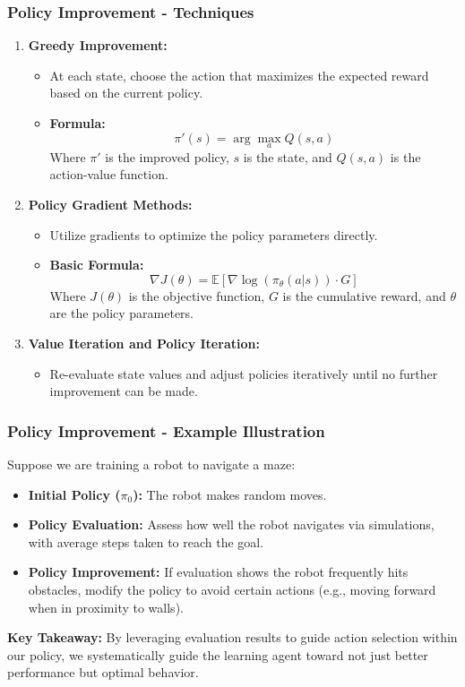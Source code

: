 \documentclass[aspectratio=169]{beamer}
\begin{document}
\begin{frame}[fragile]
    \frametitle{Policy Improvement - Techniques}
    \begin{enumerate}
        \item \textbf{Greedy Improvement:}
            \begin{itemize}
                \item At each state, choose the action that maximizes the expected reward based on the current policy.
                \item \textbf{Formula:} 
                \[
                \pi' (s) = \arg\max_a Q(s, a)
                \]
                Where \(\pi'\) is the improved policy, \(s\) is the state, and \(Q(s, a)\) is the action-value function.
            \end{itemize}
        
        \item \textbf{Policy Gradient Methods:}
            \begin{itemize}
                \item Utilize gradients to optimize the policy parameters directly.
                \item \textbf{Basic Formula:}
                \[
                \nabla J(\theta) = \mathbb{E}[\nabla \log(\pi_\theta(a|s)) \cdot G]
                \]
                Where \(J(\theta)\) is the objective function, \(G\) is the cumulative reward, and \(\theta\) are the policy parameters.
            \end{itemize}
        
        \item \textbf{Value Iteration and Policy Iteration:}
            \begin{itemize}
                \item Re-evaluate state values and adjust policies iteratively until no further improvement can be made.
            \end{itemize}
    \end{enumerate}
\end{frame}

\begin{frame}[fragile]
    \frametitle{Policy Improvement - Example Illustration}
    Suppose we are training a robot to navigate a maze: 
    \begin{itemize}
        \item \textbf{Initial Policy (\(\pi_0\)):} The robot makes random moves.
        \item \textbf{Policy Evaluation:} Assess how well the robot navigates via simulations, with average steps taken to reach the goal.
        \item \textbf{Policy Improvement:} If evaluation shows the robot frequently hits obstacles, modify the policy to avoid certain actions (e.g., moving forward when in proximity to walls).
    \end{itemize}
    
    \textbf{Key Takeaway:} By leveraging evaluation results to guide action selection within our policy, we systematically guide the learning agent toward not just better performance but optimal behavior.
\end{frame}
\end{document}
